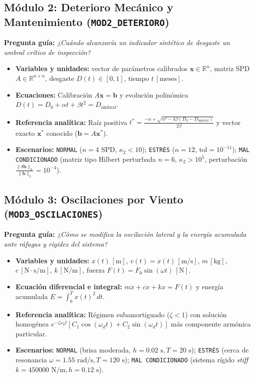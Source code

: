 \documentclass[11pt,a4paper]{article}
\begin{document}
\subsection{Módulo 2: Deterioro Mecánico y Mantenimiento (\texttt{MOD2\_DETERIORO})}
\textbf{Pregunta guía:} \textit{¿Cuándo alcanzaría un indicador sintético de desgaste un umbral crítico de inspección?}
\begin{itemize}[noitemsep]
    \item \textbf{Variables y unidades:} vector de parámetros calibrados $\mathbf{x}\in\mathbb{R}^n$, matriz SPD $A\in\mathbb{R}^{n\times n}$, desgaste $D(t)\in[0,1]$, tiempo $t\,[\text{meses}]$.
    \item \textbf{Ecuaciones:} Calibración $A\mathbf{x}=\mathbf{b}$ y evolución polinómica $D(t)=D_0+\alpha t+\beta t^2=D_{\text{umbral}}$.
    \item \textbf{Referencia analítica:} Raíz positiva $t^* = \frac{-\alpha+\sqrt{\alpha^2-4\beta(D_0-D_{\text{umbral}})}}{2\beta}$ y vector exacto $\mathbf{x}^*$ conocido ($\mathbf{b}=A\mathbf{x}^*$).
    \item \textbf{Escenarios:} \texttt{NORMAL} ($n=4$ SPD, $\kappa_2<10$); \texttt{ESTRÉS} ($n=12$, $\text{tol}=10^{-11}$); \texttt{MAL CONDICIONADO} (matriz tipo Hilbert perturbada $n=6$, $\kappa_2>10^5$, perturbación $\frac{\|\delta\mathbf{b}\|_2}{\|\mathbf{b}\|_2}=10^{-4}$).
\end{itemize}

\subsection{Módulo 3: Oscilaciones por Viento (\texttt{MOD3\_OSCILACIONES})}
\textbf{Pregunta guía:} \textit{¿Cómo se modifica la oscilación lateral y la energía acumulada ante ráfagas y rigidez del sistema?}
\begin{itemize}[noitemsep]
    \item \textbf{Variables y unidades:} $x(t)\,[\text{m}]$, $v(t)=\dot{x}(t)\,[\text{m/s}]$, $m\,[\text{kg}]$, $c\,[\text{N}\cdot\text{s/m}]$, $k\,[\text{N/m}]$, fuerza $F(t)=F_0\sin(\omega t)\,[\text{N}]$.
    \item \textbf{Ecuación diferencial e integral:} $m\ddot{x}+c\dot{x}+kx=F(t)$ y energía acumulada $E = \int_0^T x(t)^2\,dt$.
    \item \textbf{Referencia analítica:} Régimen subamortiguado ($\zeta<1$) con solución homogénea $e^{-\zeta\omega_0 t}[C_1\cos(\omega_d t)+C_2\sin(\omega_d t)]$ más componente armónica particular.
    \item \textbf{Escenarios:} \texttt{NORMAL} (brisa moderada, $h=0.02\text{ s}, T=20\text{ s}$); \texttt{ESTRÉS} (cerca de resonancia $\omega=1.55\text{ rad/s}, T=120\text{ s}$); \texttt{MAL CONDICIONADO} (sistema rígido \textit{stiff} $k=450000\text{ N/m}, h=0.12\text{ s}$).
\end{itemize}
\end{document}
